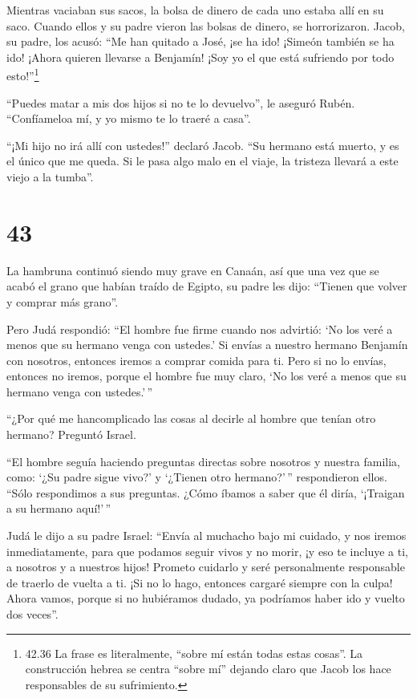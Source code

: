  Mientras vaciaban sus sacos, la bolsa de dinero de cada
uno estaba allí en su saco. Cuando ellos y su padre vieron las bolsas de
dinero, se horrorizaron.  Jacob, su padre, los acusó: ``Me
han quitado a José, ¡se ha ido! ¡Simeón también se ha ido! ¡Ahora
quieren llevarse a Benjamín! ¡Soy yo el que está sufriendo por todo
esto!''\footnote{42.36 La frase es literalmente, ``sobre mí están todas
  estas cosas''. La construcción hebrea se centra ``sobre mí'' dejando
  claro que Jacob los hace responsables de su sufrimiento.}

 ``Puedes matar a mis dos hijos si no te lo devuelvo'', le
aseguró Rubén. ``Confíameloa mí, y yo mismo te lo traeré a casa''.

 ``¡Mi hijo no irá allí con ustedes!'' declaró Jacob. ``Su
hermano está muerto, y es el único que me queda. Si le pasa algo malo en
el viaje, la tristeza llevará a este viejo a la tumba''.

\hypertarget{section-42}{%
\section{43}\label{section-42}}

 La hambruna continuó siendo muy grave en Canaán,
 así que una vez que se acabó el grano que habían traído de
Egipto, su padre les dijo: ``Tienen que volver y comprar más grano''.

 Pero Judá respondió: ``El hombre fue firme cuando nos
advirtió: `No los veré a menos que su hermano venga con ustedes.'
 Si envías a nuestro hermano Benjamín con nosotros, entonces
iremos a comprar comida para ti.  Pero si no lo envías,
entonces no iremos, porque el hombre fue muy claro, `No los veré a menos
que su hermano venga con ustedes.'\,''

 ``¿Por qué me hancomplicado las cosas al decirle al hombre
que tenían otro hermano? Preguntó Israel.

 ``El hombre seguía haciendo preguntas directas sobre
nosotros y nuestra familia, como: `¿Su padre sigue vivo?' y `¿Tienen
otro hermano?'\,'' respondieron ellos. ``Sólo respondimos a sus
preguntas. ¿Cómo íbamos a saber que él diría, `¡Traigan a su hermano
aquí!'\,''

 Judá le dijo a su padre Israel: ``Envía al muchacho bajo mi
cuidado, y nos iremos inmediatamente, para que podamos seguir vivos y no
morir, ¡y eso te incluye a ti, a nosotros y a nuestros hijos!
 Prometo cuidarlo y seré personalmente responsable de
traerlo de vuelta a ti. ¡Si no lo hago, entonces cargaré siempre con la
culpa!  Ahora vamos, porque si no hubiéramos dudado, ya
podríamos haber ido y vuelto dos veces''.


